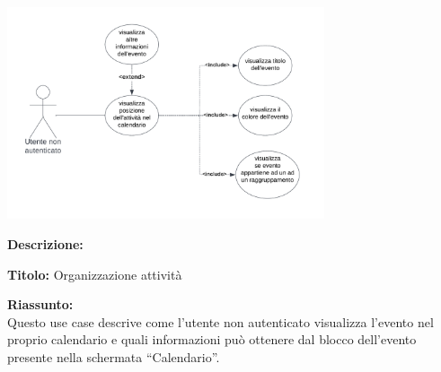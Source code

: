 \begin{listaPersonale}[UC]{}
    \newpage


    \begin{center}
        \includegraphics[width=0.7\textwidth]{img/Diagrammi/UseCases/InserimentoAutomaticoCalendario.png}
    \end{center}

    \textbf{Descrizione:}

    \textbf{Titolo:} Organizzazione attività

    \textbf{Riassunto:} \\
    Questo use case descrive come l'utente non autenticato visualizza l'evento nel proprio calendario e quali informazioni può ottenere dal blocco dell'evento presente nella schermata “Calendario”.


\end{listaPersonale}
